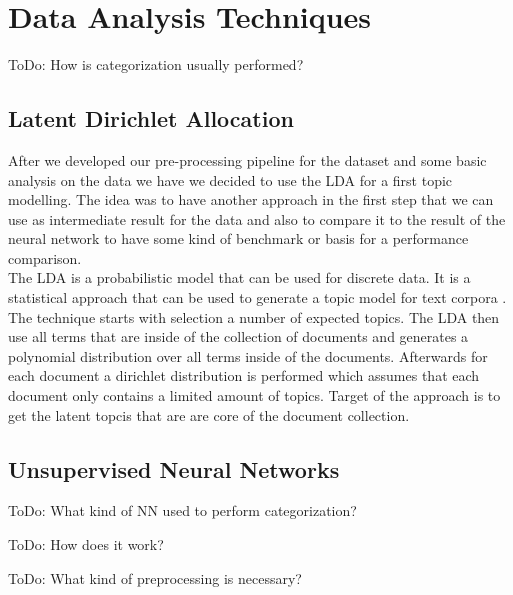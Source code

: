 \section{Data Analysis Techniques} %
\label{sec:data_anal_tech}

\colorbox{yellow!30}{ToDo:} How is categorization usually performed?

\subsection{Latent Dirichlet Allocation} %
\label{sub:lda}
After we developed our pre-processing pipeline for the dataset and some basic analysis on the data we have we decided to use the LDA for a first topic modelling. The idea was to have another approach in the first step that we can use as intermediate result for the data and also to compare it to the result of the neural network to have some kind of benchmark or basis for a performance comparison.\\
The LDA is a probabilistic model that can be used for discrete data. It is a statistical approach that can be used to generate a topic model for text corpora \cite{blei_latent_nodate}. The technique starts with selection a number of expected topics. The LDA then use all terms that are inside of the collection of documents and generates a polynomial distribution over all terms inside of the documents. Afterwards for each document a dirichlet distribution is performed which assumes that each document only contains a limited amount of topics. Target of the approach is to get the latent topcis that are are core of the document collection.

\subsection{Unsupervised Neural Networks} %
\label{sub:unsup_nn}
\colorbox{yellow!30}{ToDo:} What kind of NN used to perform categorization?

\colorbox{yellow!30}{ToDo:} How does it work?

\colorbox{yellow!30}{ToDo:} What kind of preprocessing is necessary?

